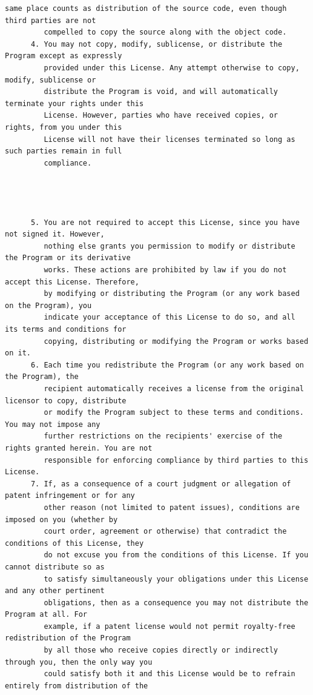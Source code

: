 \begin{lstlisting}[basicstyle=\ttfamily\footnotesize,breaklines=true]
         same place counts as distribution of the source code, even though third parties are not
         compelled to copy the source along with the object code.
      4. You may not copy, modify, sublicense, or distribute the Program except as expressly
         provided under this License. Any attempt otherwise to copy, modify, sublicense or
         distribute the Program is void, and will automatically terminate your rights under this
         License. However, parties who have received copies, or rights, from you under this
         License will not have their licenses terminated so long as such parties remain in full
         compliance.




      5. You are not required to accept this License, since you have not signed it. However,
         nothing else grants you permission to modify or distribute the Program or its derivative
         works. These actions are prohibited by law if you do not accept this License. Therefore,
         by modifying or distributing the Program (or any work based on the Program), you
         indicate your acceptance of this License to do so, and all its terms and conditions for
         copying, distributing or modifying the Program or works based on it.
      6. Each time you redistribute the Program (or any work based on the Program), the
         recipient automatically receives a license from the original licensor to copy, distribute
         or modify the Program subject to these terms and conditions. You may not impose any
         further restrictions on the recipients' exercise of the rights granted herein. You are not
         responsible for enforcing compliance by third parties to this License.
      7. If, as a consequence of a court judgment or allegation of patent infringement or for any
         other reason (not limited to patent issues), conditions are imposed on you (whether by
         court order, agreement or otherwise) that contradict the conditions of this License, they
         do not excuse you from the conditions of this License. If you cannot distribute so as
         to satisfy simultaneously your obligations under this License and any other pertinent
         obligations, then as a consequence you may not distribute the Program at all. For
         example, if a patent license would not permit royalty-free redistribution of the Program
         by all those who receive copies directly or indirectly through you, then the only way you
         could satisfy both it and this License would be to refrain entirely from distribution of the

\end{lstlisting}
